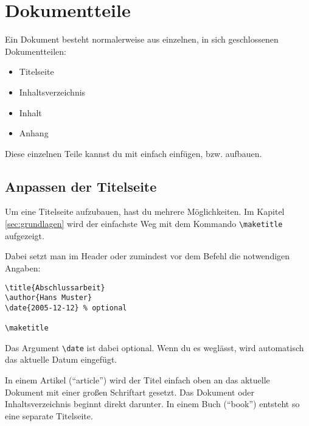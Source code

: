 %
%

\chapter{Dokumentteile}

Ein Dokument besteht normalerweise aus einzelnen, in sich geschlossenen Dokumentteilen:

\begin{itemize}
	\item Titelseite
	\item Inhaltsverzeichnis
	\item Inhalt
	\item Anhang
\end{itemize}

Diese einzelnen Teile kannst du mit \DMLLaTeX{} einfach einfügen, bzw. aufbauen.

\section{Anpassen der Titelseite}

Um eine Titelseite aufzubauen, hast du mehrere Möglichkeiten. Im Kapitel \ref{sec:grundlagen} wird der einfachste Weg mit dem Kommando \texttt{\textbackslash maketitle} aufgezeigt.

Dabei setzt man im Header oder zumindest vor dem Befehl die notwendigen Angaben:
\begin{lstlisting}
\title{Abschlussarbeit}
\author{Hans Muster}
\date{2005-12-12} % optional

\maketitle
\end{lstlisting}

Das Argument \texttt{\textbackslash date} ist dabei optional. Wenn du es weglässt, wird automatisch das aktuelle Datum eingefügt. 

In einem Artikel (\enquote{article}) wird der Titel einfach oben an das aktuelle Dokument mit einer großen Schriftart gesetzt. Das Dokument oder Inhaltsverzeichnis beginnt direkt darunter. In einem Buch (\enquote{book}) entsteht so eine separate Titelseite.

